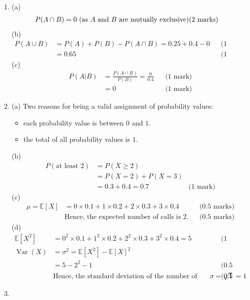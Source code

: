 \documentclass[a4paper,oneside]{book}
\DeclareMathOperator{\var}{Var}
\begin{document}
\begin{enumerate}
\item 
  (a) 
  \begin{align*}
    P(A\cap B) & = 0 \text{ (as $A$ and $B$ are mutually exclusive)} \hfill
    \text{(2 marks)}
  \end{align*}
  (b)
  \begin{align*}  
    P(A\cup B) &= P(A) + P(B) - P(A\cap B) = 0.25 + 0.4 - 0 && \text{(1 mark)} \\
    &= 0.65 && \text{(1 mark)}
  \end{align*}
  (c)
  \begin{align*}
    P(A|B) &= \frac{P(A\cap B)}{P(B)} = \frac{0}{0.4} && \text{(1
      mark)} \\
    &= 0 && \text{(1 mark)}
  \end{align*}

\item (a) Two reasons for being a valid assignment of probability
  values:
  \begin{itemize}
  \item each probability value is between $0$ and $1$.
  \item the total of all probability values is $1$.
  \end{itemize}
  (b) \begin{align*}
    P(\text{at least 2}) &= P(X \ge 2)\\
    &= P(X=2) + P(X=3) \\
    &= 0.3 + 0.4 = 0.7 & \text{(1 mark)}
  \end{align*}
  (c) \begin{align*}
    \mu = \mathbb{E}[X] &= 0\times 0.1 + 1\times 0.2 + 2\times 0.3 +
    3\times 0.4 && \text{(0.5 marks)} \\
      & \text{Hence, the expected number of calls is $2$.} && \text{(0.5 marks)}
  \end{align*}
  (d)
  \begin{align*}
    \mathbb{E}[X^2] &= 0^2\times 0.1 + 1^2\times 0.2 + 2^2\times 0.3 +
    3^2\times 0.4 = 5 && \text{(1 mark)} \\
    \var(X) &= \sigma^2 = \mathbb{E}[X^2] - \mathbb{E}[X]^2 \\
    &= 5 - 2^2 - 1 && \text{(0.5 marks)} \\
    & \text{Hence, the standard deviation of the number of calls }
    \sigma = \sqrt{1} = 1 && \text{(0.5 marks)}
  \end{align*}
\item 


\end{enumerate}
\end{document}
